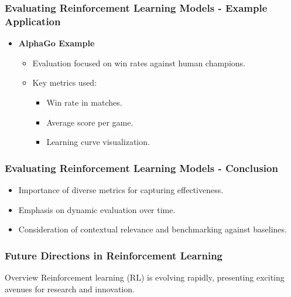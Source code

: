 \documentclass[aspectratio=169]{beamer}
\begin{document}
\begin{frame}[fragile]
    \frametitle{Evaluating Reinforcement Learning Models - Example Application}
    \begin{itemize}
        \item \textbf{AlphaGo Example}
            \begin{itemize}
                \item Evaluation focused on win rates against human champions.
                \item Key metrics used:
                    \begin{itemize}
                        \item Win rate in matches.
                        \item Average score per game.
                        \item Learning curve visualization.
                    \end{itemize}
            \end{itemize}
    \end{itemize}
\end{frame}

\begin{frame}[fragile]
    \frametitle{Evaluating Reinforcement Learning Models - Conclusion}
    \begin{itemize}
        \item Importance of diverse metrics for capturing effectiveness.
        \item Emphasis on dynamic evaluation over time.
        \item Consideration of contextual relevance and benchmarking against baselines.
    \end{itemize}
\end{frame}

\begin{frame}[fragile]
    \frametitle{Future Directions in Reinforcement Learning}
    
    \begin{block}{Overview}
        Reinforcement learning (RL) is evolving rapidly, presenting exciting avenues for research and innovation.
    \end{block}
\end{frame}
\end{document}
